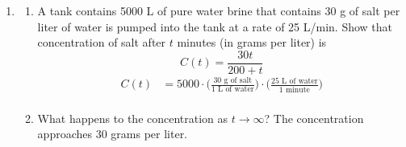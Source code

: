 \documentclass{article}
\begin{document}
\begin{enumerate}
\begin{center}
\begin{minipage}{.7\textwidth}
		\begin{center}
		\pgfplotsset{width=0.9\linewidth,height=5cm}
		\end{center}
		\end{minipage}
		\end{center}
		
		
\setcounter{enumi}{54}
	\item \begin{enumerate}
		\item A tank contains 5000 L of pure water brine that contains 30 g of salt per liter of water is pumped into the tank at a rate of 25 L/min. Show that concentration of salt after $t$ minutes (in grams per liter) is $$C(t)=\frac{30t}{200+t}$$
		$$\begin{align}
			C(t)&= 5000 \cdot \Big(\frac{30\text{ g of salt}}{1\text{ L of water}}\Big) \cdot \Big(\frac{25\text{ L of water}}{1\text{ minute}}\Big)\\
		\end{align}$$
		\item What happens to the concentration as $t\rightarrow \infty$?\newline
			The concentration approaches 30 grams per liter.
	\end{enumerate}
\end{enumerate}
	
\end{document}

